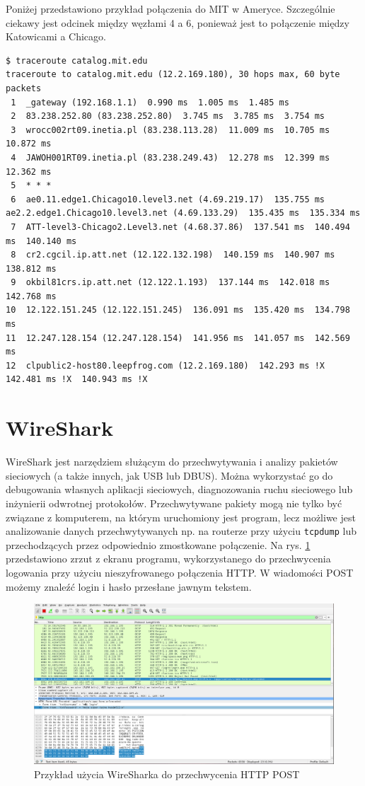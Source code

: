 \documentclass{article}
\begin{document}
Poniżej przedstawiono przykład połączenia do MIT w Ameryce. Szczególnie ciekawy jest odcinek między węzłami 4 a 6, ponieważ jest to połączenie między Katowicami a Chicago.
\begin{lstlisting}
$ traceroute catalog.mit.edu
traceroute to catalog.mit.edu (12.2.169.180), 30 hops max, 60 byte packets
 1  _gateway (192.168.1.1)  0.990 ms  1.005 ms  1.485 ms
 2  83.238.252.80 (83.238.252.80)  3.745 ms  3.785 ms  3.754 ms
 3  wrocc002rt09.inetia.pl (83.238.113.28)  11.009 ms  10.705 ms  10.872 ms
 4  JAWOH001RT09.inetia.pl (83.238.249.43)  12.278 ms  12.399 ms  12.362 ms
 5  * * *
 6  ae0.11.edge1.Chicago10.level3.net (4.69.219.17)  135.755 ms ae2.2.edge1.Chicago10.level3.net (4.69.133.29)  135.435 ms  135.334 ms
 7  ATT-level3-Chicago2.Level3.net (4.68.37.86)  137.541 ms  140.494 ms  140.140 ms
 8  cr2.cgcil.ip.att.net (12.122.132.198)  140.159 ms  140.907 ms  138.812 ms
 9  okbil81crs.ip.att.net (12.122.1.193)  137.144 ms  142.018 ms  142.768 ms
10  12.122.151.245 (12.122.151.245)  136.091 ms  135.420 ms  134.798 ms
11  12.247.128.154 (12.247.128.154)  141.956 ms  141.057 ms  142.569 ms
12  clpublic2-host80.leepfrog.com (12.2.169.180)  142.293 ms !X  142.481 ms !X  140.943 ms !X

\end{lstlisting}
    \section{WireShark}
    WireShark jest narzędziem służącym do przechwytywania i analizy pakietów sieciowych (a także innych, jak USB lub DBUS).
    Można wykorzystać go do debugowania własnych aplikacji sieciowych, diagnozowania ruchu sieciowego lub inżynierii odwrotnej protokołów.
    Przechwytywane pakiety mogą nie tylko być związane z komputerem, na którym uruchomiony jest program, lecz możliwe jest analizowanie danych przechwytywanych np. na routerze przy użyciu  \texttt{tcpdump} lub przechodzących przez odpowiednio zmostkowane połączenie.
    Na rys. \ref{fig:shark} przedstawiono zrzut z ekranu programu, wykorzystanego do przechwycenia logowania przy użyciu nieszyfrowanego połączenia HTTP. W wiadomości POST możemy znaleźć login i hasło przesłane jawnym tekstem.
    \begin{figure}[h!]
        \centering
        \includegraphics[width=17cm]{wireshark.png}
        \caption{Przykład użycia WireSharka do przechwycenia HTTP POST}
        \label{fig:shark}
    \end{figure}
\end{document}
